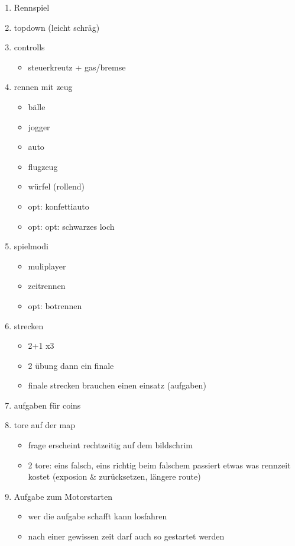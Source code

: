 	\begin{enumerate}
		\item{Rennspiel}
		\item{topdown (leicht schräg)}
		\item{controlls}
		\begin{itemize}
			\item{steuerkreutz + gas/bremse}
		\end{itemize}
		\item{rennen mit zeug}
		\begin{itemize}
			\item{bälle}
			\item{jogger}
			\item{auto}
			\item{flugzeug}
			\item{würfel (rollend)}
			\item{opt: konfettiauto}
			\item{opt: opt: schwarzes loch}
		\end{itemize}
		\item{spielmodi}
		\begin{itemize}
			\item{muliplayer}
			\item{zeitrennen}
			\item{opt: botrennen}
		\end{itemize}
		\item{strecken}
		\begin{itemize}
			\item{2+1 x3}
			\item{2 übung dann ein finale}
			\item{finale strecken brauchen einen einsatz (aufgaben)}
		\end{itemize}
		\item{aufgaben für coins}
		\item{tore auf der map}
		\begin{itemize}
			\item{frage erscheint rechtzeitig auf dem bildschrim}
			\item{2 tore: eins falsch, eins richtig
				beim falschem passiert etwas was rennzeit kostet (exposion \& zurücksetzen, längere route)}
		\end{itemize}
		\item{Aufgabe zum Motorstarten}
			\begin{itemize}
				\item{wer die aufgabe schafft kann losfahren}
				\item{nach einer gewissen zeit darf auch so gestartet werden}

\end{itemize}
\end{enumerate}
